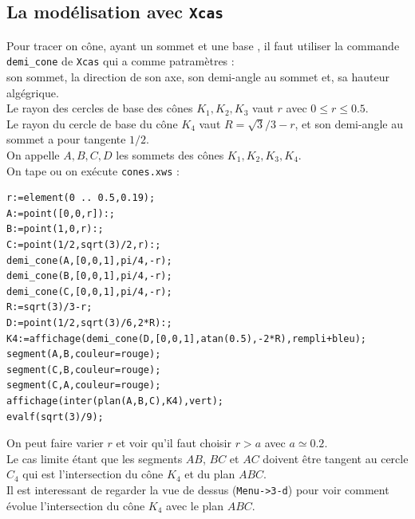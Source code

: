 \documentclass[a4paper,11pt]{book}
\begin{document}
\subsection{La mod\'elisation avec {\tt Xcas}}
Pour tracer on c\^one, ayant un sommet et une base , il faut utiliser la 
commande {\tt demi\_cone} de {\tt Xcas}  qui a comme patram\`etres :\\
son sommet, la direction de son axe, son demi-angle au sommet et,
 sa hauteur alg\'egrique.\\ 
Le rayon des cercles de base des c\^ones $K_1,K_2,K_3$ vaut $r$ avec 
$0 \leq r\leq 0.5$.\\
Le rayon du cercle de base du c\^one $K_4$ vaut $R=\sqrt 3/3-r$, et son 
demi-angle au sommet a pour tangente $1/2$.\\
On appelle $A,B,C,D$ les sommets des c\^ones $K_1,K_2,K_3,K_4$.\\ 
On tape ou on ex\'ecute {\tt cones.xws} :
\begin{verbatim}
r:=element(0 .. 0.5,0.19);
A:=point([0,0,r]):;
B:=point(1,0,r):;
C:=point(1/2,sqrt(3)/2,r):;
demi_cone(A,[0,0,1],pi/4,-r);
demi_cone(B,[0,0,1],pi/4,-r);
demi_cone(C,[0,0,1],pi/4,-r);
R:=sqrt(3)/3-r;
D:=point(1/2,sqrt(3)/6,2*R):;
K4:=affichage(demi_cone(D,[0,0,1],atan(0.5),-2*R),rempli+bleu);
segment(A,B,couleur=rouge);
segment(C,B,couleur=rouge);
segment(C,A,couleur=rouge);
affichage(inter(plan(A,B,C),K4),vert);
evalf(sqrt(3)/9);
\end{verbatim}
On peut faire varier $r$ et voir qu'il faut choisir $r>a$ avec $a\simeq 0.2$.\\
Le cas limite \'etant que les segments $AB$, $BC$ et $AC$ doivent \^etre 
tangent au cercle $C_4$ qui est l'intersection du c\^one $K_4$ et du plan 
$ABC$.\\
Il est interessant de regarder la vue de dessus ({\tt Menu->3-d}) pour voir comment \'evolue l'intersection du c\^one $K_4$ avec le plan $ABC$.
\end{document}

